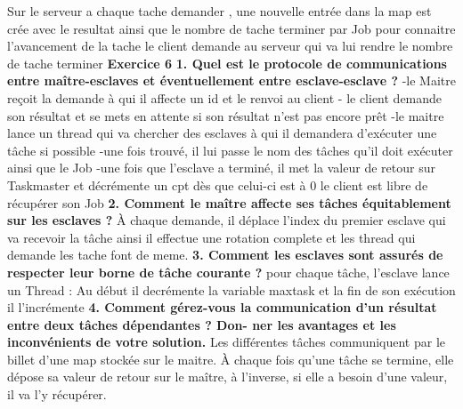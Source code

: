 \documentclass{article}
\begin{document}
\newline
\newline
Sur le serveur a chaque tache demander , une nouvelle entrée dans la map est crée avec le resultat ainsi que le nombre de tache terminer par Job
pour connaitre l'avancement de la tache le client demande au serveur qui va lui rendre le nombre de tache terminer
\newline
\newline
\textbf{Exercice 6}
\newline
\textbf{1. Quel est le protocole de communications entre maître-esclaves et éventuellement entre
esclave-esclave ?}
-le Maitre reçoit la demande à qui il affecte un id et le renvoi au client 
- le client demande son résultat et se mets en attente si son résultat n'est pas encore prêt 
-le maitre lance un thread qui va chercher  des esclaves à qui il demandera d'exécuter une tâche si possible 
-une fois trouvé, il lui passe le nom des tâches qu'il doit exécuter ainsi que le Job
-une fois que l'esclave a terminé, il met la valeur de retour sur Taskmaster et décrémente un cpt dès que celui-ci est à 0 le client est libre de récupérer son Job
\newline
\newline
\textbf{2. Comment le maître affecte ses tâches équitablement sur les esclaves ?}
\newline
À chaque demande, il déplace l'index du premier esclave qui va recevoir la tâche ainsi il effectue une rotation complete et les thread qui demande 
les tache font de meme.
\newline
\textbf{3. Comment les esclaves sont assurés de respecter leur borne de tâche courante ?}
\newline
pour chaque tâche, l'esclave lance un Thread : Au début il decrémente la variable maxtask et la fin de son exécution il l'incrémente
\newline
\textbf{4. Comment gérez-vous la communication d’un résultat entre deux tâches dépendantes ? Don-
ner les avantages et les inconvénients de votre solution.}
\newline
Les différentes tâches communiquent par le billet d'une map stockée sur le maitre. 
À chaque fois qu'une tâche se termine, elle dépose sa valeur de retour sur le maître, à l'inverse, si elle a besoin d'une valeur, il va l'y récupérer. 
\end{document}
